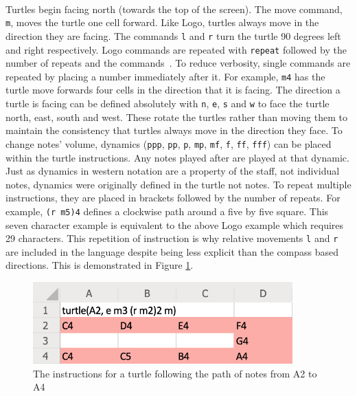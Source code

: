 \paragraph{} Turtles begin facing north (towards the top of the screen). The move command, \texttt{m}, moves the turtle one cell forward. Like Logo, turtles always move in the direction they are facing. The commands \texttt{l} and \texttt{r} turn the turtle 90 degrees left and right respectively. Logo commands are repeated with \texttt{repeat} followed by the number of repeats and the commands~\cite{goldman:turtle}. To reduce verbosity, single commands are repeated by placing a number immediately after it. For example, \texttt{m4} has the turtle move forwards four cells in the direction that it is facing. The direction a turtle is facing can be defined absolutely with \texttt{n}, \texttt{e}, \texttt{s} and \texttt{w} to face the turtle north, east, south and west. These rotate the turtles rather than moving them to maintain the consistency that turtles always move in the direction they face. To change notes' volume, dynamics (\texttt{ppp}, \texttt{pp}, \texttt{p}, \texttt{mp}, \texttt{mf}, \texttt{f}, \texttt{ff}, \texttt{fff}) can be placed within the turtle instructions. Any notes played after are played at that dynamic. Just as dynamics in western notation are a property of the staff, not individual notes, dynamics were originally defined in the turtle not notes. To repeat multiple instructions, they are placed in brackets followed by the number of repeats. For example, \texttt{(r m5)4}  defines a clockwise path around a five by five square. This seven character example is equivalent to the above Logo example which requires 29 characters. This repetition of instruction is why relative movements \texttt{l} and \texttt{r} are included in the language despite being less explicit than the compass based directions. This is demonstrated in Figure \ref{prep:language1}.

\begin{figure}[ht]
  \centerline{\includegraphics[width=100mm]{figs/sheetDiss1.png}}
\caption{The instructions for a turtle following the path of notes from A2 to A4}
\label{prep:language1}
\end{figure}

